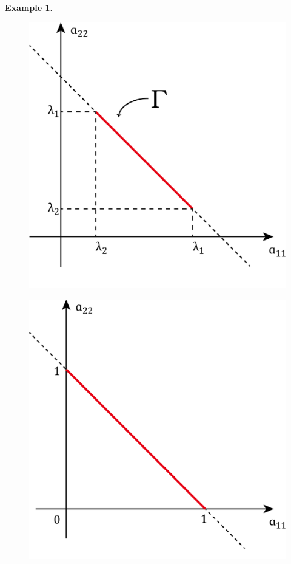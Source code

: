 \documentclass[11pt]{amsart}
\numberwithin{equation}{section}
\theoremstyle{plain}
\newtheorem{eg}[theorem]{Example}
\theoremstyle{plain}
\numberwithin{equation}{section}
\theoremstyle{remark}
\begin{document}
\begin{eg}
\begin{figure}[th]
\begin{minipage}[t]{.49\textwidth}
		\centering
		\includegraphics[width=.95\textwidth]{figures/figure1.png}\\
		\caption{}
		\label{fig3}
	\end{minipage}
	\begin{minipage}[t]{.49\textwidth}
		\centering
		\includegraphics[width=.95\textwidth]{figures/figure2.png}\\

\end{minipage}
\end{figure}
\end{eg}
\end{document}
